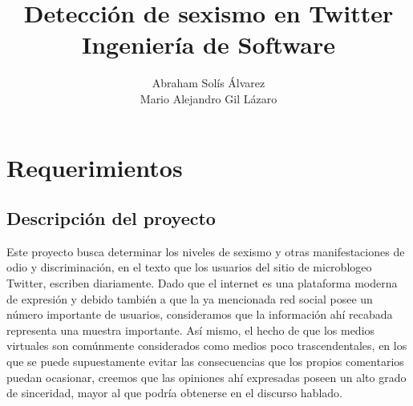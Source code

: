 \documentclass{article}
\begin{document}



\title {Detección de sexismo en Twitter \\ Ingeniería de Software}
\author{Abraham Solís Álvarez \\ Mario Alejandro Gil Lázaro}
\maketitle


\addtolength{\parskip}{-2ex}
\tableofcontents
\addtolength{\parskip}{2ex}

\section{Requerimientos}
\subsection{Descripción del proyecto}
Este proyecto busca determinar los niveles de sexismo y otras manifestaciones
de odio y discriminación, en el texto que los usuarios del sitio de
microblogeo Twitter, escriben diariamente. Dado que el internet es una
plataforma moderna de expresión y debido también a que la ya mencionada red
social posee un número importante de usuarios, consideramos que la información
ahí recabada representa una muestra importante. Así mismo, el hecho de que
los medios virtuales son comúnmente considerados como medios poco
trascendentales, en los que se puede supuestamente evitar las consecuencias
que los propios comentarios puedan ocasionar, creemos que las opiniones ahí
expresadas poseen un alto grado de sinceridad, mayor al que podría obtenerse
en el discurso hablado.
\end{document}

